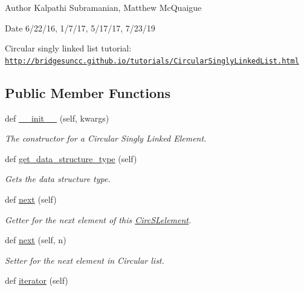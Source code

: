 \begin{DoxyAuthor}{Author}
Kalpathi Subramanian, Matthew Mc\+Quaigue
\end{DoxyAuthor}
\begin{DoxyDate}{Date}
6/22/16, 1/7/17, 5/17/17, 7/23/19
\end{DoxyDate}
Circular singly linked list tutorial\+: \href{http://bridgesuncc.github.io/tutorials/CircularSinglyLinkedList.html}{\tt http\+://bridgesuncc.\+github.\+io/tutorials/\+Circular\+Singly\+Linked\+List.\+html} \subsection*{Public Member Functions}
\begin{DoxyCompactItemize}
\item 
def \hyperlink{classbridges_1_1circ__sl__element_1_1_circ_s_lelement_a8ffff39d70e7e94d8d8573e555a6ff35}{\+\_\+\+\_\+init\+\_\+\+\_\+} (self, kwargs)
\begin{DoxyCompactList}\small\item\em The constructor for a Circular Singly Linked Element. \end{DoxyCompactList}\item 
def \hyperlink{classbridges_1_1circ__sl__element_1_1_circ_s_lelement_a82b1dbb8592c943eb68161ee60ac3492}{get\+\_\+data\+\_\+structure\+\_\+type} (self)
\begin{DoxyCompactList}\small\item\em Gets the data structure type. \end{DoxyCompactList}\item 
def \hyperlink{classbridges_1_1circ__sl__element_1_1_circ_s_lelement_a5abc123aa4a20414a02785f3b1cc342a}{next} (self)
\begin{DoxyCompactList}\small\item\em Getter for the next element of this \hyperlink{classbridges_1_1circ__sl__element_1_1_circ_s_lelement}{Circ\+S\+Lelement}. \end{DoxyCompactList}\item 
def \hyperlink{classbridges_1_1circ__sl__element_1_1_circ_s_lelement_a0215303874e167e22f92e4adbdee1e84}{next} (self, n)
\begin{DoxyCompactList}\small\item\em Setter for the next element in Circular list. \end{DoxyCompactList}\item 
def \hyperlink{classbridges_1_1circ__sl__element_1_1_circ_s_lelement_a8c95461772d1f997afa11e2cabc3fd21}{iterator} (self)
\end{DoxyCompactItemize}
